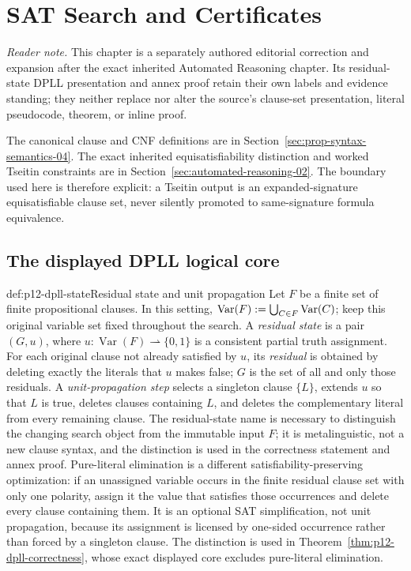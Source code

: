 \chapter{SAT Search and Certificates}
\label{sec:p12-sat-and-certificates}

\noindent\emph{Reader note.}
This chapter is a separately authored editorial correction and expansion after
the exact inherited Automated Reasoning chapter.  Its residual-state DPLL
presentation and annex proof retain their own labels and evidence standing;
they neither replace nor alter the source's clause-set presentation, literal
pseudocode, theorem, or inline proof.

The canonical clause and CNF definitions are in
Section~\ref{sec:prop-syntax-semantics-04}.  The exact inherited
equisatisfiability distinction and worked Tseitin constraints are in
Section~\ref{sec:automated-reasoning-02}.  The boundary used here is therefore
explicit: a Tseitin output is an expanded-signature equisatisfiable clause set,
never silently promoted to same-signature formula equivalence.

\section{The displayed DPLL logical core}

\begin{hbdefinition}{def:p12-dpll-state}{Residual state and unit propagation}
Let \(F\) be a finite set of finite propositional clauses.  In this setting,
\(\operatorname{Var}(F)\mathrel{:=}
\bigcup_{C\in F}\operatorname{Var}(C)\); keep this original variable set
fixed throughout the search.  A \emph{residual state} is a
pair \((G,u)\), where \(u:\operatorname{Var}(F)\rightharpoonup\{0,1\}\) is a
consistent partial truth assignment.  For each original clause not already
satisfied by \(u\), its \emph{residual} is obtained by deleting exactly the
literals that \(u\) makes false; \(G\) is the set of all and only those
residuals.  A \emph{unit-propagation step} selects
a singleton clause \(\{L\}\), extends \(u\) so that \(L\) is true, deletes
clauses containing \(L\), and deletes the complementary literal from every
remaining clause.  The residual-state name is necessary to distinguish the
changing search object from the immutable input \(F\); it is metalinguistic,
not a new clause syntax, and the distinction is used in the correctness
statement and annex proof.  Pure-literal elimination is a different
satisfiability-preserving optimization: if an unassigned variable occurs in
the finite residual clause set with only one polarity, assign it the value that
satisfies those occurrences and delete every clause containing them.  It is an
optional SAT simplification, not unit propagation, because its assignment is
licensed by one-sided occurrence rather than forced by a singleton clause.
The distinction is used in Theorem~\ref{thm:p12-dpll-correctness}, whose exact
displayed core excludes pure-literal elimination.
\end{hbdefinition}

